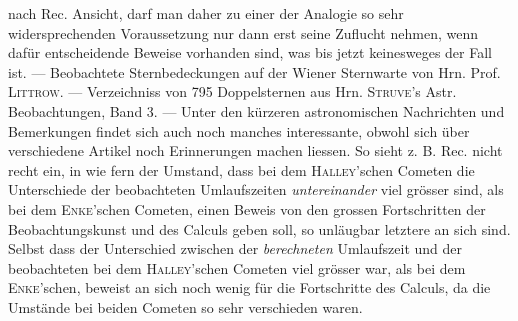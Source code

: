 nach Rec. Ansicht, darf man daher zu einer der Analogie so sehr widersprechenden Voraussetzung nur dann erst seine Zuflucht nehmen, wenn dafür entscheidende Beweise vorhanden sind, was bis jetzt keinesweges der Fall ist. --- Beobachtete Sternbedeckungen auf der Wiener Sternwarte von Hrn. Prof. \textsc{Littrow}. --- Verzeichniss von 795 Doppelsternen aus Hrn. \textsc{Struve}'s Astr. Beobachtungen, Band 3. --- Unter den kürzeren astronomischen Nachrichten und Bemerkungen findet sich auch noch manches interessante, obwohl sich über verschiedene Artikel noch Erinnerungen machen liessen. So sieht z. B. Rec. nicht recht ein, in wie fern der Umstand, dass bei dem \textsc{Halley}'schen Cometen die Unterschiede der beobachteten Umlaufszeiten \emph{untereinander} viel grösser sind, als bei dem \textsc{Enke}'schen Cometen, einen Beweis von den grossen Fortschritten der Beobachtungskunst und des Calculs geben soll, so unläugbar letztere an sich sind. Selbst dass der Unterschied zwischen der \emph{berechneten} Umlaufszeit und der beobachteten bei dem \textsc{Halley}'schen Cometen viel grösser war, als bei dem \textsc{Enke}'schen, beweist an sich noch wenig für die Fortschritte des Calculs, da die Umstände bei beiden Cometen so sehr verschieden waren.
